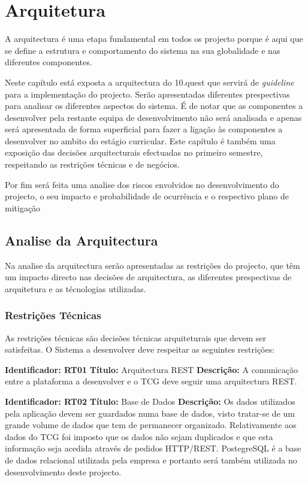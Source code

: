  \chapter{Arquitetura}
\label{sec:arquitetura}

A arquitectura é uma etapa fundamental em todos os projecto porque é aqui que se define a estrutura e comportamento do sistema na sua globalidade e nas diferentes componentes.

Neste capítulo está exposta a arquitectura do 10.quest que servirá de \textit{guideline} para a implementação do projecto. Serão apresentadas diferentes prespectivas para analisar os diferentes aspectos do sistema. É de notar que as componentes a desenvolver pela restante equipa de desenvolvimento não será analisada e apenas será apresentada de forma superficial para fazer a ligação às componentes a desenvolver no ambito do estágio curricular.
Este capítulo é também uma exposição das decisões arquitecturais efectuadas no primeiro semestre, respeitando as restrições técnicas e de negócios.

Por fim será feita uma analise dos riscos envolvidos no desenvolvimento do projecto, o seu impacto e probabilidade de ocurrência e o respectivo plano de mitigação




\section{Analise da Arquitectura}
\label{analisearq}

Na analise da arquitectura serão apresentadas as restrições do projecto, que têm um impacto directo nas decisões de arquitectura, as diferentes prespectivas de arquitetura e as técnologias utilizadas.

\subsection{Restrições Técnicas}
As restrições técnicas são decisões técnicas arquiteturais que devem ser satisfeitas. O Sistema a desenvolver deve respeitar as seguintes restrições:

\textbf{Identificador: RT01}
\newline
\textbf{Título:} Arquitectura REST
\newline
\textbf{Descrição:} A comunicação entre a plataforma a desenvolver e o TCG deve seguir uma arquitectura REST.

\textbf{Identificador: RT02}
\newline
\textbf{Título:} Base de Dados
\newline
\textbf{Descrição:} Os dados utilizados pela aplicação devem ser guardados numa base de dados, visto tratar-se de um grande volume de dados que tem de permanecer organizado. Relativamente aos dados do TCG foi imposto que os dados não sejam duplicados e que esta informação seja acedida através de pedidos HTTP/REST. PostegreSQL\cite{sql} é a base de dados relacional utilizada pela empresa e portanto será também utilizada no desenvolvimento deste projecto.


